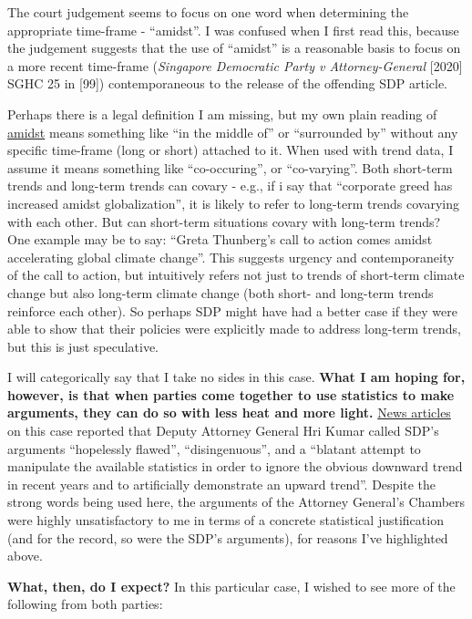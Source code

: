 \documentclass[openany]{book}
\begin{document}
The court judgement seems to focus on one word when determining the
appropriate time-frame - ``amidst''. I was confused when I first read
this, because the judgement suggests that the use of ``amidst'' is a
reasonable basis to focus on a more recent time-frame (\emph{Singapore
Democratic Party v Attorney-General} {[}2020{]} SGHC 25 in {[}99{]})
contemporaneous to the release of the offending SDP article.

Perhaps there is a legal definition I am missing, but my own plain
reading of \href{https://www.dictionary.com/browse/amidst}{amidst} means
something like ``in the middle of'' or ``surrounded by'' without any
specific time-frame (long or short) attached to it. When used with trend
data, I assume it means something like ``co-occuring'', or
``co-varying''. Both short-term trends and long-term trends can covary -
e.g., if i say that ``corporate greed has increased amidst
globalization'', it is likely to refer to long-term trends covarying
with each other. But can short-term situations covary with long-term
trends? One example may be to say: ``Greta Thunberg's call to action
comes amidst accelerating global climate change''. This suggests urgency
and contemporaneity of the call to action, but intuitively refers not
just to trends of short-term climate change but also long-term climate
change (both short- and long-term trends reinforce each other). So
perhaps SDP might have had a better case if they were able to show that
their policies were explicitly made to address long-term trends, but
this is just speculative.

I will categorically say that I take no sides in this case. \textbf{What
I am hoping for, however, is that when parties come together to use
statistics to make arguments, they can do so with less heat and more
light.}
\href{https://www.todayonline.com/singapore/sdps-arguments-defence-statements-pmet-jobs-hopelessly-flawed-agc}{News
articles} on this case reported that Deputy Attorney General Hri Kumar
called SDP's arguments ``hopelessly flawed'', ``disingenuous'', and a
``blatant attempt to manipulate the available statistics in order to
ignore the obvious downward trend in recent years and to artificially
demonstrate an upward trend''. Despite the strong words being used here,
the arguments of the Attorney General's Chambers were highly
unsatisfactory to me in terms of a concrete statistical justification
(and for the record, so were the SDP's arguments), for reasons I've
highlighted above.

\textbf{What, then, do I expect?} In this particular case, I wished to
see more of the following from both parties:
\end{document}
